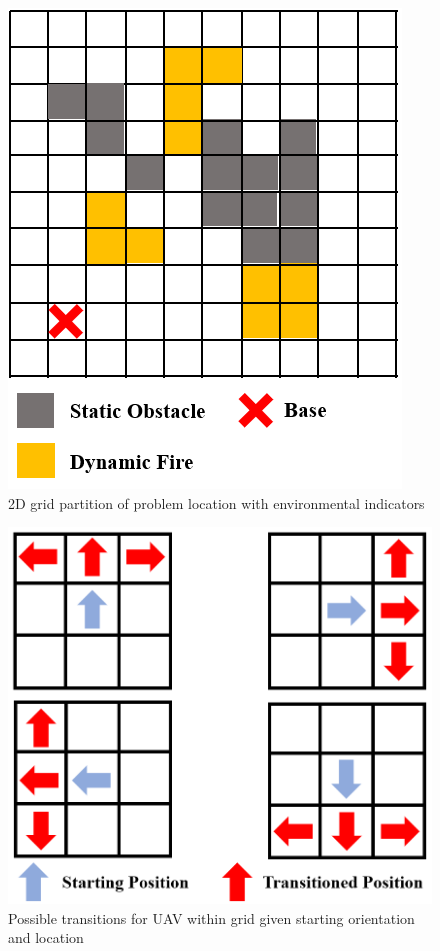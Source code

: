 \documentclass[journal]{IEEEtran}
\begin{document}
 \begin{figure}
	\includegraphics[width = 0.8 \linewidth]{GridPartitionVert}
	\centering
	\caption{2D grid partition of problem location with environmental indicators}
	\label{probpartition}
\end{figure}

 \begin{figure}
	\includegraphics[width = 0.8 \linewidth]{Transitions}
	\centering
	\caption{Possible transitions for UAV within grid given starting orientation and location}
	\label{transitions}
\end{figure}
\end{document}

